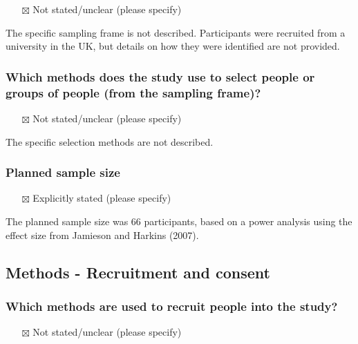 \documentclass[
  doc, a4paper]{apa7}
\providecommand{\tightlist}{%
  \setlength{\itemsep}{0pt}\setlength{\parskip}{0pt}}
\begin{document}
\begin{itemize}
\tightlist
\item[$\boxtimes$]
  Not stated/unclear (please specify)
\end{itemize}

The specific sampling frame is not described. Participants were recruited from a university in the UK, but details on how they were identified are not provided.

\subsubsection{Which methods does the study use to select people or groups of people (from the sampling frame)?}\label{which-methods-does-the-study-use-to-select-people-or-groups-of-people-from-the-sampling-frame}

\begin{itemize}
\tightlist
\item[$\boxtimes$]
  Not stated/unclear (please specify)
\end{itemize}

The specific selection methods are not described.

\subsubsection{Planned sample size}\label{planned-sample-size}

\begin{itemize}
\tightlist
\item[$\boxtimes$]
  Explicitly stated (please specify)
\end{itemize}

The planned sample size was 66 participants, based on a power analysis using the effect size from Jamieson and Harkins (2007).

\subsection{Methods - Recruitment and consent}\label{methods---recruitment-and-consent}

\subsubsection{Which methods are used to recruit people into the study?}\label{which-methods-are-used-to-recruit-people-into-the-study}

\begin{itemize}
\tightlist
\item[$\boxtimes$]
  Not stated/unclear (please specify)
\end{itemize}
\end{document}
